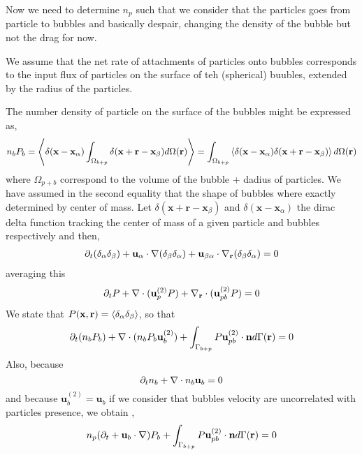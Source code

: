 Now we need to determine $n_p$ such that we consider that the particles goes from particle to bubbles and basically despair, changing the density of the bubble but not the drag for now. 


We assume that the net rate of attachments of particles onto bubbles corresponds to the input flux of particles on the surface of teh (spherical) buubles, extended by the radius of the particles. 

The number density of particle on the surface of the bubbles might be expressed as, 
\begin{equation}
    n_b P_b 
    = 
    \left<\delta(\textbf{x}-\textbf{x}_\alpha) \int_{\Omega_{b+p}} \delta(\textbf{x} + \textbf{r} - \textbf{x}_\beta) d\Omega(\textbf{r})\right>
    = 
    \int_{\Omega_{b+p}}\left<\delta(\textbf{x}-\textbf{x}_\alpha)  \delta(\textbf{x} + \textbf{r} - \textbf{x}_\beta) \right>d\Omega(\textbf{r})
\end{equation}
where $\Omega_{p+b}$ correspond to the volume of the bubble + dadius of particles. 
We have assumed in the second equality that the shape of bubbles where exactly determined by center of mass. 
Let $\delta(\textbf{x} +\textbf{r}- \textbf{x}_\beta)$ and $\delta(\textbf{x} - \textbf{x}_\alpha)$ the dirac delta function tracking the center of mass of a given particle and bubbles respectively and then, 
\begin{align}
    \partial_t (\delta_\alpha\delta_\beta)
    + \textbf{u}_\alpha \cdot \mathbf{\nabla} (\delta_\beta \delta_\alpha) 
    + \textbf{u}_{\beta\alpha} \cdot {\mathbf{\nabla}_\textbf{r}} (\delta_\beta \delta_\alpha) = 0
\end{align}
averaging this 
\begin{align}
    \partial_t P
    +  \mathbf{\nabla}\cdot (\textbf{u}_p^{(2)} P) 
    +  {\mathbf{\nabla}_\textbf{r}}\cdot (\textbf{u}_{pb}^{(2)} P) = 0
\end{align}
We state that $P(\textbf{x},\textbf{r}) = \left<\delta_\alpha \delta_\beta\right>$, so that 
\begin{equation}
    \partial_t (n_bP_b)
    +  \mathbf{\nabla}\cdot (n_b P_b \textbf{u}_b^{(2)} )
    + \int_{\Gamma_{b+p}} P \textbf{u}_{pb}^{(2)}\cdot \textbf{n} d\Gamma(\textbf{r})
    = 0 
\end{equation}
Also, because 
\begin{equation}
    \partial_t n_b + \mathbf{\nabla}\cdot n_b \textbf{u}_b = 0 
\end{equation}
and because $\textbf{u}_b^{(2)} = \textbf{u}_b$ if we consider that bubbles velocity are uncorrelated with particles presence, we obtain ,
\begin{equation}
    n_p (\partial_t 
    +  \textbf{u}_b \cdot \mathbf{\nabla} ) P_b
    + \int_{\Gamma_{b+p}} P \textbf{u}_{pb}^{(2)}\cdot \textbf{n} d\Gamma(\textbf{r})
    = 0 
\end{equation}

